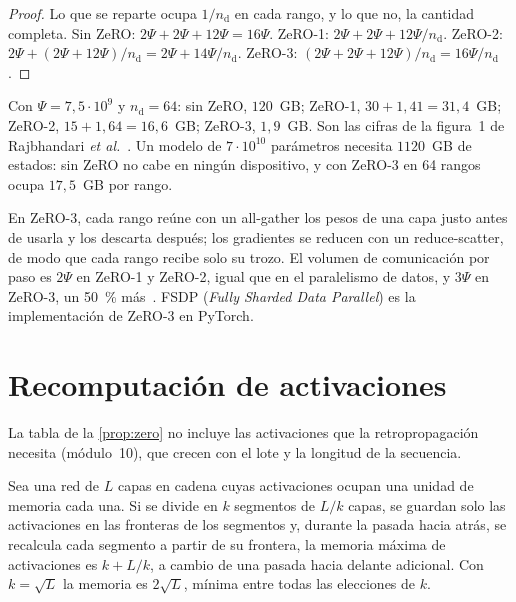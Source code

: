 \begin{proof}
Lo que se reparte ocupa $1/n_{\mathrm{d}}$ en cada rango, y lo que no, la cantidad completa. Sin ZeRO: $2\Psi+2\Psi+12\Psi=16\Psi$. ZeRO-1: $2\Psi+2\Psi+12\Psi/n_{\mathrm{d}}$. ZeRO-2: $2\Psi+(2\Psi+12\Psi)/n_{\mathrm{d}}=2\Psi+14\Psi/n_{\mathrm{d}}$. ZeRO-3: $(2\Psi+2\Psi+12\Psi)/n_{\mathrm{d}}=16\Psi/n_{\mathrm{d}}$.
\end{proof}

\begin{ejemplo}\label{ej:zero}
Con $\Psi=7{,}5\cdot 10^{9}$ y $n_{\mathrm{d}}=64$: sin ZeRO, $120$~GB; ZeRO-1, $30+1{,}41=31{,}4$~GB; ZeRO-2, $15+1{,}64=16{,}6$~GB; ZeRO-3, $1{,}9$~GB. Son las cifras de la figura~1 de Rajbhandari \emph{et al.}~\cite{zero}. Un modelo de $7\cdot 10^{10}$ parámetros necesita $1120$~GB de estados: sin ZeRO no cabe en ningún dispositivo, y con ZeRO-3 en 64 rangos ocupa $17{,}5$~GB por rango.
\end{ejemplo}

En ZeRO-3, cada rango reúne con un all-gather los pesos de una capa justo antes de usarla y los descarta después; los gradientes se reducen con un reduce-scatter, de modo que cada rango recibe solo su trozo. El volumen de comunicación por paso es $2\Psi$ en ZeRO-1 y ZeRO-2, igual que en el paralelismo de datos, y $3\Psi$ en ZeRO-3, un 50~\% más~\cite[§7]{zero}. FSDP (\emph{Fully Sharded Data Parallel}) es la implementación de ZeRO-3 en PyTorch.

\section{Recomputación de activaciones}

La tabla de la \cref{prop:zero} no incluye las activaciones que la retropropagación necesita (módulo~10), que crecen con el lote y la longitud de la secuencia.

\begin{proposicion}\label{prop:checkpoint}
Sea una red de $L$ capas en cadena cuyas activaciones ocupan una unidad de memoria cada una. Si se divide en $k$ segmentos de $L/k$ capas, se guardan solo las activaciones en las fronteras de los segmentos y, durante la pasada hacia atrás, se recalcula cada segmento a partir de su frontera, la memoria máxima de activaciones es $k+L/k$, a cambio de una pasada hacia delante adicional. Con $k=\sqrt{L}$ la memoria es $2\sqrt{L}$, mínima entre todas las elecciones de $k$.
\end{proposicion}

